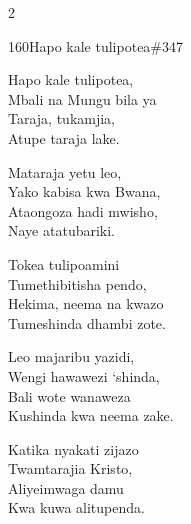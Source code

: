 \begin{multicols}{2}
\begin{hymn}{160}{Hapo kale tulipotea}{\#347}
\begin{stanza}
Hapo kale tulipotea,\\
Mbali na Mungu bila ya\\
Taraja, tukamjia,\\
Atupe taraja lake.
\end{stanza}
\begin{chorus}
Mataraja yetu leo,\\
Yako kabisa kwa Bwana,\\
Ataongoza hadi mwisho,\\
Naye atatubariki.
\end{chorus}
\begin{stanza}
Tokea tulipoamini\\
Tumethibitisha pendo,\\
Hekima, neema na kwazo\\
Tumeshinda dhambi zote.
\end{stanza}
\begin{stanza}
Leo majaribu yazidi,\\
Wengi hawawezi `shinda,\\
Bali wote wanaweza\\
Kushinda kwa neema zake.
\end{stanza}
\begin{stanza}
Katika nyakati zijazo\\
Twamtarajia Kristo,\\
Aliyeimwaga damu\\
Kwa kuwa alitupenda.
\end{stanza}
\end{hymn}


\end{multicols}
